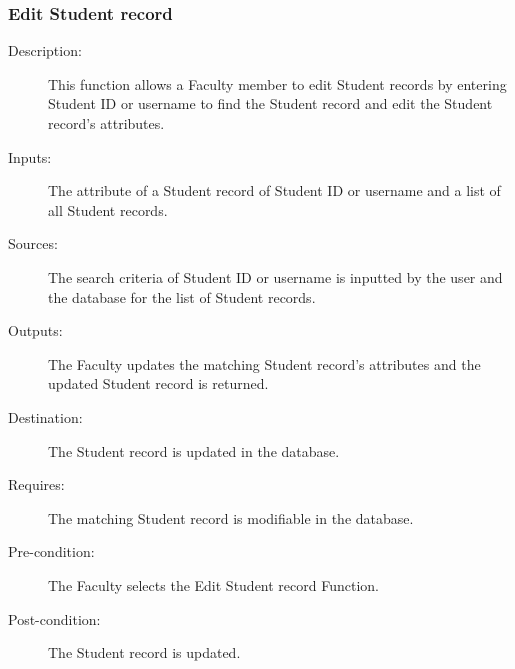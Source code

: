 \subsubsection{\large Edit Student record} 
\begin{boxed} %
\begin{description}
\item[Description:]
   This function allows a Faculty member to edit Student records by entering
   Student ID or username to find the Student record and edit the Student
   record's attributes.
\item[Inputs:]
   The attribute of a Student record of Student ID or username and a list of all
   Student records.
\item[Sources:]
   The search criteria of Student ID or username is inputted by the user and the
   database for the list of Student records.
\item[Outputs:]
   The Faculty updates the matching Student record's attributes and the updated
   Student record is returned.
\item[Destination:]
   The Student record is updated in the database.
\item[Requires:]
   The matching Student record is modifiable in the database.
\item[Pre-condition:]
   The Faculty selects the Edit Student record Function.
\item[Post-condition:]
   The Student record is updated.
\end{description}
\end{boxed} %

